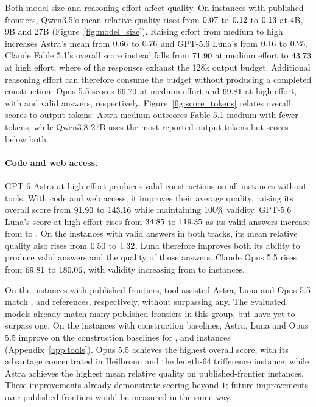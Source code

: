 \documentclass{article}
\begin{document}
Both model size and reasoning effort affect quality. On instances with published frontiers, Qwen3.5's mean relative quality rises from $0.07$ to $0.12$ to $0.13$ at 4B, 9B and 27B (Figure~\ref{fig:model_size}). Raising effort from medium to high increases Astra's mean from $0.66$ to $0.76$ and GPT-5.6 Luna's from $0.16$ to $0.25$. Claude Fable 5.1's overall score instead falls from $71.90$ at medium effort to $43.73$ at high effort, where \FableHighBudgetStops{} of the \DistinctN{} responses exhaust the 128k output budget. Additional reasoning effort can therefore consume the budget without producing a completed construction. Opus 5.5 scores $66.70$ at medium effort and $69.81$ at high effort, with \OpusMediumValid{} and \OpusHighValid{} valid answers, respectively. Figure~\ref{fig:score_tokens} relates overall scores to output tokens: Astra medium outscores Fable 5.1 medium with fewer tokens, while Qwen3.8-27B uses the most reported output tokens but scores below both.
\par

\paragraph{Code and web access.}
GPT-6 Astra at high effort produces valid constructions on all \DistinctN{} instances without tools. With code and web access, it improves their average quality, raising its overall score from $91.90$ to $143.16$ while maintaining $100\%$ validity. GPT-5.6 Luna's score at high effort rises from $34.85$ to $119.35$ as its valid answers increase from \LunaToolFreeValid{} to \LunaToolValid{}. On the \LunaBothValidN{} instances with valid answers in both tracks, its mean relative quality also rises from $0.50$ to $1.32$. Luna therefore improves both its ability to produce valid answers and the quality of those answers. Claude Opus 5.5 rises from $69.81$ to $180.06$, with validity increasing from \OpusHighValid{} to \OpusToolValid{} instances.

On the \PanelOneN{} instances with published frontiers, tool-assisted Astra, Luna and Opus 5.5 match \ToolPublishedMatched{}, \LunaToolPublishedMatched{} and \OpusToolPublishedMatched{} references, respectively, without surpassing any. The evaluated models already match many published frontiers in this group, but have yet to surpass one. On the \PanelTwoN{} instances with construction baselines, Astra, Luna and Opus 5.5 improve on the construction baselines for \ToolConstructionAbove{}, \LunaToolConstructionAbove{} and \OpusToolConstructionAbove{} instances (Appendix~\ref{app:tools}). Opus 5.5 achieves the highest overall score, with its advantage concentrated in Heilbronn and the length-64 trifference instance, while Astra achieves the highest mean relative quality on published-frontier instances. These improvements already demonstrate scoring beyond $1$; future improvements over published frontiers would be measured in the same way.
\end{document}
